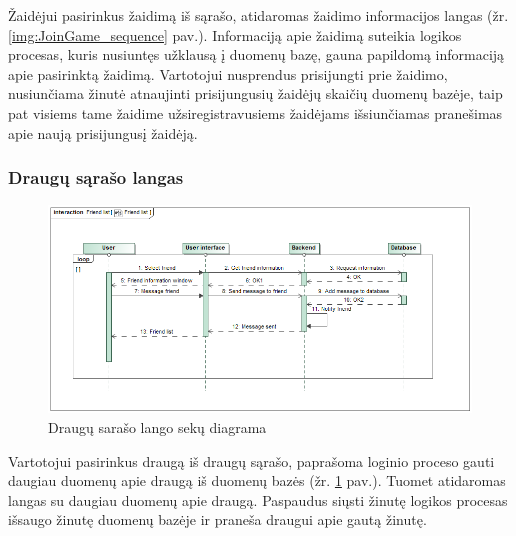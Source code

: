 \documentclass{VUMIFPSkursinis}
\begin{document}
			Žaidėjui pasirinkus žaidimą iš sąrašo, atidaromas žaidimo informacijos 
			langas (žr. \ref{img:JoinGame_sequence} pav.). Informaciją apie žaidimą suteikia logikos procesas, kuris
			nusiuntęs užklausą į duomenų bazę, gauna papildomą informaciją apie 
			pasirinktą žaidimą. Vartotojui nusprendus prisijungti prie žaidimo, 
			nusiunčiama žinutė atnaujinti prisijungusių žaidėjų skaičių duomenų bazėje,
			taip pat visiems tame žaidime užsiregistravusiems žaidėjams išsiunčiamas 
			pranešimas apie naują prisijungusį žaidėją.

	\subsubsection{Draugų sąrašo langas}		
			\begin{figure}[H]
				\centering
				\includegraphics[scale=0.5]{img/FriendList_sequence}
				\caption{Draugų sarašo lango sekų diagrama}
				\label{img:FriendList_sequence}
			\end{figure}
			Vartotojui pasirinkus draugą iš draugų sąrašo, paprašoma loginio proceso
			gauti daugiau duomenų apie draugą iš duomenų bazės (žr. \ref{img:FriendList_sequence} pav.). Tuomet atidaromas 
			langas su daugiau duomenų apie draugą. Paspaudus siųsti žinutę logikos 
			procesas išsaugo žinutę duomenų bazėje ir praneša draugui apie gautą žinutę.
			
\end{document}
